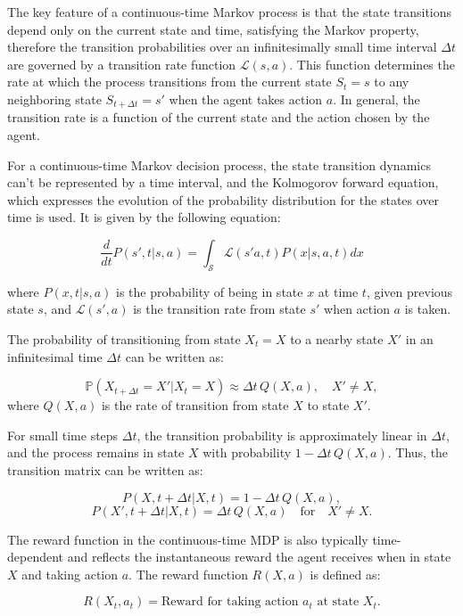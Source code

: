 The key feature of a continuous-time Markov process is that the state transitions depend only on the current state and time, satisfying the Markov property, therefore the transition probabilities over an infinitesimally small time interval $\Delta t$ are governed by a transition rate function $\mathcal{L}(s, a)$. This function determines the rate at which the process transitions from the current state \( S_t = s \) to any neighboring state \( S_{t+\Delta t} = s' \) when the agent takes action $a$. In general, the transition rate is a function of the current state and the action chosen by the agent.

For a continuous-time Markov decision process, the state transition dynamics can't be represented by a time interval, and the Kolmogorov forward equation, which expresses the evolution of the probability distribution for the states over time is used. It is given by the following equation:

$$
\frac{d}{dt} P(s', t | s, a) = \int_{\mathcal{S}} \mathcal{L}(s' a, t) P(x| s, a, t) dx
$$

where $P(x, t | s, a)$ is the probability of being in state $x$ at time $t$, given previous state $s$, and $\mathcal{L}(s', a)$ is the transition rate from state $s'$ when action $a$ is taken.

The probability of transitioning from state \( X_t = X \) to a nearby state \( X' \) in an infinitesimal time \( \Delta t \) can be written as:

$$
\mathbb{P}(X_{t+\Delta t} = X' | X_t = X) \approx \Delta t \, Q(X, a), \quad X' \neq X,
$$
where \( Q(X, a) \) is the rate of transition from state \( X \) to state \( X' \).

For small time steps \( \Delta t \), the transition probability is approximately linear in \( \Delta t \), and the process remains in state \( X \) with probability \( 1 - \Delta t \, Q(X, a) \). Thus, the transition matrix can be written as:

$$
P(X, t + \Delta t | X, t) = 1 - \Delta t \, Q(X, a),
$$
$$
P(X', t + \Delta t | X, t) = \Delta t \, Q(X, a) \quad \text{for} \quad X' \neq X.
$$

The reward function in the continuous-time MDP is also typically time-dependent and reflects the instantaneous reward the agent receives when in state \( X \) and taking action \( a \). The reward function \( R(X, a) \) is defined as:

$$
R(X_t, a_t) = \text{Reward for taking action } a_t \text{ at state } X_t.
$$

